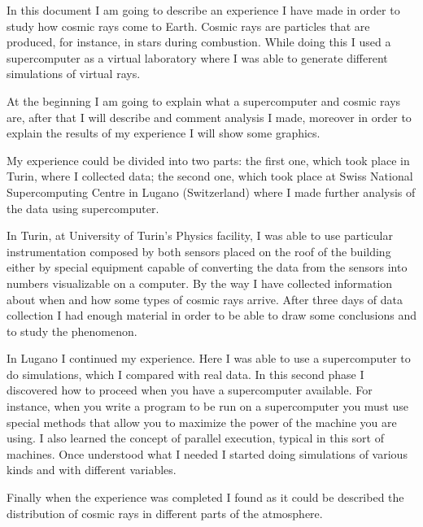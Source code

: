 In this document I am going to describe an experience I have made in order to study how cosmic rays come to Earth. Cosmic rays are particles that are produced, for instance, in stars during combustion. While doing this I used a supercomputer as a virtual laboratory where I was able to generate different simulations of virtual rays.

At the beginning I am going to explain what a supercomputer and cosmic rays are, after that I will describe and comment analysis I made, moreover in order to explain the results of my experience I will show some graphics.

My experience could be divided into two parts: the first one, which took place in Turin, where I collected data; the second one, which took place at Swiss National Supercomputing Centre in Lugano (Switzerland) where I made further analysis of the data using supercomputer. 

In Turin, at University of Turin's Physics facility, I was able to use particular instrumentation composed by both sensors placed on the roof of the building either by special equipment capable of converting the data from the sensors into numbers visualizable on a computer. By the way I have collected information about when and how some types of cosmic rays arrive. After three days of data collection I had enough material in order to be able to draw some conclusions and to study the phenomenon. 

In Lugano I continued my experience. Here I was able to use a supercomputer to do simulations, which I compared with real data. In this second phase I discovered how to proceed when you have a supercomputer available. For instance, when you write a program to be run on a supercomputer you must use special methods that allow you to maximize the power of the machine you are using. I also learned the concept of parallel execution, typical in this sort of machines. Once understood what I needed I started doing simulations of various kinds and with different variables.

Finally when the experience was completed I found as it could be described the distribution of cosmic rays in different parts of the atmosphere.
